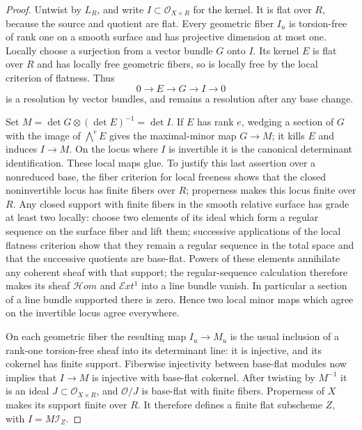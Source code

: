 \begin{proof}
Untwist by \(L_R\), and write \(I\subset\mathcal O_{X\times R}\) for the
kernel.  It is flat over \(R\), because the source and quotient are flat.
Every geometric fiber \(I_u\) is torsion-free of rank one on a smooth
surface and has projective dimension at most one.  Locally choose a
surjection from a vector bundle \(G\) onto \(I\).  Its kernel \(E\) is
flat over \(R\) and has locally free geometric fibers, so is locally
free by the local criterion of flatness.  Thus
\[
 0\longrightarrow E\longrightarrow G\longrightarrow I\longrightarrow0
\]
is a resolution by vector bundles, and remains a resolution after any
base change.

Set \(M=\det G\otimes(\det E)^{-1}=\det I\).  If \(E\) has rank \(e\),
wedging a section of \(G\) with the image of \(\bigwedge^eE\) gives the
maximal-minor map \(G\to M\); it kills \(E\) and induces \(I\to M\).
On the locus where \(I\) is invertible it is the canonical determinant
identification.  These local maps glue.  To justify this last assertion
over a nonreduced base, the fiber criterion for local freeness shows
that the closed noninvertible locus has finite fibers over \(R\);
properness makes this locus finite over \(R\).
Any closed support with finite fibers in the smooth relative
surface has grade at least two locally: choose two elements of its
ideal which form a regular sequence on the surface fiber and lift
them; successive applications of the local flatness criterion show
that they remain a regular sequence in the total space and that the
successive quotients are base-flat.  Powers of these elements
annihilate any coherent sheaf with that support; the regular-sequence
calculation therefore makes its sheaf \(\mathcal{H}om\) and
\(\mathcal Ext^1\) into a line bundle vanish.  In particular
a section of a line bundle supported there is zero.  Hence two local
minor maps which agree on the invertible locus agree everywhere.

On each geometric fiber the resulting map \(I_u\to M_u\) is the usual
inclusion of a rank-one torsion-free sheaf into its determinant line:
it is injective, and its cokernel has finite support.  Fiberwise
injectivity between base-flat modules now implies that \(I\to M\) is
injective with base-flat cokernel.  After twisting by \(M^{-1}\) it
is an ideal \(J\subset\mathcal O_{X\times R}\), and
\(\mathcal O/J\) is base-flat with finite fibers.  Properness of \(X\)
makes its support finite over \(R\).  It therefore defines a finite
flat subscheme \(Z\), with \(I=M\mathcal I_Z\).


\end{proof}
